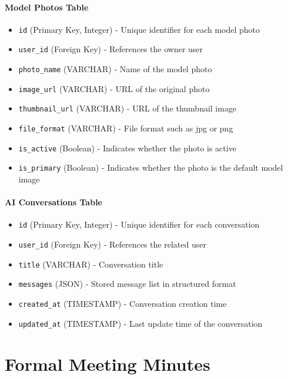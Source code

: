 \begin{appendices}
\subsubsection{Model Photos Table}
\begin{itemize}
    \item \texttt{id} (Primary Key, Integer) - Unique identifier for each model photo
    \item \texttt{user\_id} (Foreign Key) - References the owner user
    \item \texttt{photo\_name} (VARCHAR) - Name of the model photo
    \item \texttt{image\_url} (VARCHAR) - URL of the original photo
    \item \texttt{thumbnail\_url} (VARCHAR) - URL of the thumbnail image
    \item \texttt{file\_format} (VARCHAR) - File format such as jpg or png
    \item \texttt{is\_active} (Boolean) - Indicates whether the photo is active
    \item \texttt{is\_primary} (Boolean) - Indicates whether the photo is the default model image
\end{itemize}

\subsubsection{AI Conversations Table}
\begin{itemize}
    \item \texttt{id} (Primary Key, Integer) - Unique identifier for each conversation
    \item \texttt{user\_id} (Foreign Key) - References the related user
    \item \texttt{title} (VARCHAR) - Conversation title
    \item \texttt{messages} (JSON) - Stored message list in structured format
    \item \texttt{created\_at} (TIMESTAMP) - Conversation creation time
    \item \texttt{updated\_at} (TIMESTAMP) - Last update time of the conversation
\end{itemize}



\chapter{Formal Meeting Minutes}

\end{appendices}
